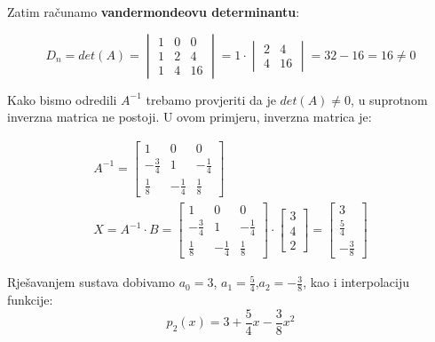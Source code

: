Zatim računamo \textbf{vandermondeovu determinantu}:

$$
D_n =
det(A) =
\begin{vmatrix}
1 & 0 & 0 \\
1 & 2 & 4 \\
1 & 4 & 16
\end{vmatrix}
= 1 \cdot
\begin{vmatrix}
2 & 4 \\
4 & 16
\end{vmatrix}
= 32 - 16 = 16 \neq 0
$$

\begin{multicols}{2}

Kako bismo odredili $A^{-1}$ trebamo provjeriti da je $det(A)\neq0$, u suprotnom inverzna matrica ne postoji. U ovom primjeru, inverzna matrica je:

\begin{gather*}
A^{-1} =
\begin{bmatrix}
1 & 0 & 0\\
-{\frac{3}{4}} & 1 & -{\frac{1}{4}}\\
{\frac{1}{8}} & -{\frac{1}{4}} & {\frac{1}{8}}
\end{bmatrix}\\
X = A^{-1}\cdot B =
\begin{bmatrix}
1 & 0 & 0\\
-\frac{3}{4} & 1 & -\frac{1}{4}\\
\frac{1}{8} & -\frac{1}{4} & \frac{1}{8}
\end{bmatrix}
\cdot
\begin{bmatrix}
3 \\ 4 \\ 2
\end{bmatrix}
=
\begin{bmatrix}
3 \\ \frac{5}{4} \\ -\frac{3}{8}
\end{bmatrix}
\end{gather*}

Rješavanjem sustava dobivamo $a_0=3$, $a_1=\frac{5}{4}$,\break$a_2=-\frac{3}{8}$,
kao i interpolaciju funkcije:
$$
p_2(x) = 3 + \frac{5}{4}x - \frac{3}{8}x^2
$$

\newcolumn

\vspace*{0pt}


\end{multicols}

